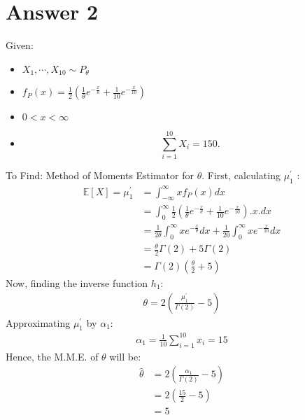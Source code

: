 \documentclass[a4paper]{article}
\begin{document}
\section{Answer 2}
Given:
\begin{itemize}
	\item {$X_1, \cdots, X_{10} \sim P_{\theta}$}
	\item{$f_P\left( x \right) = \frac{1}{2}\left( \frac{1}{\theta} e^{-\frac{x}{\theta}} + \frac{1}{10} e^{-\frac{x}{10}}\right) $}
	\item{$0<x<\infty$}
	\item{ \[
				\sum_{i=1}^{10} X_i = 150
	.\] }
\end{itemize}
To Find: Method of Moments Estimator for $\theta$.
 \newline\newline
 First, calculating $\mu_1^{\prime}$ :
\begin{equation*}
	\begin{split}
		\mathbb{E}\left[ X \right] = \mu_1^{\prime} &=   \int_{-\infty}^{\infty}x f_P\left( x \right) dx\\
		&= \int_0^{\infty} \frac{1}{2}\left( \frac{1}{\theta} e^{-\frac{x}{\theta}} + \frac{1}{10} e^{-\frac{x}{10}}\right) . x. dx\\
		&= \frac{1}{2\theta} \int_0^{\infty} xe^{-\frac{x}{\theta}} dx+ \frac{1}{20}\int_0^{\infty}xe^{-\frac{x}{10}} dx\\
		&= \frac{\theta}{2} \Gamma\left( 2 \right) + 5 \Gamma\left( 2 \right)\\
		&= \Gamma\left( 2 \right) \left( \frac{\theta}{2}+5 \right) 
	\end{split}
\end{equation*}
Now, finding the inverse function $h_1$:
\begin{equation*}
	\begin{split}
	\theta = 2\left(\frac{\mu_1^{\prime}}{\Gamma\left( 2 \right) } - 5 \right)
	\end{split}
\end{equation*}
Approximating $\mu_1^{\prime}$ by $\alpha_1$:
\begin{equation*}
	\begin{split}
		\alpha_1 = \frac{1}{10} \sum_{i=1}^{10} x_i = 15 
	\end{split}
\end{equation*}
Hence, the M.M.E. of $\theta$ will be:
 \begin{equation*}
	\begin{split}
		\hat{\theta} &=  2\left( \frac{\alpha_1}{\Gamma\left( 2 \right) }  - 5\right)\\
		&= 2\left( \frac{15}{2} - 5 \right)\\
		&= 5
	\end{split}
\end{equation*}
\newpage
\end{document}
